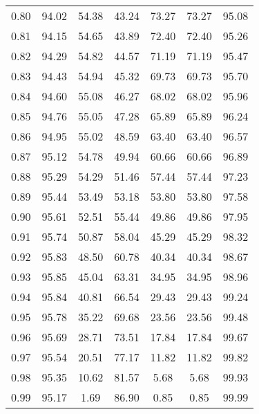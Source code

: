 \begin{tabular}{|c|c|c|c|c|c|c|}
      0.80 &     94.02 &     54.38 &      43.24 &   73.27 &      73.27 &         95.08 \\
      0.81 &     94.15 &     54.65 &      43.89 &   72.40 &      72.40 &         95.26 \\
      0.82 &     94.29 &     54.82 &      44.57 &   71.19 &      71.19 &         95.47 \\
      0.83 &     94.43 &     54.94 &      45.32 &   69.73 &      69.73 &         95.70 \\
      0.84 &     94.60 &     55.08 &      46.27 &   68.02 &      68.02 &         95.96 \\
      0.85 &     94.76 &     55.05 &      47.28 &   65.89 &      65.89 &         96.24 \\
      0.86 &     94.95 &     55.02 &      48.59 &   63.40 &      63.40 &         96.57 \\
      0.87 &     95.12 &     54.78 &      49.94 &   60.66 &      60.66 &         96.89 \\
      0.88 &     95.29 &     54.29 &      51.46 &   57.44 &      57.44 &         97.23 \\
      0.89 &     95.44 &     53.49 &      53.18 &   53.80 &      53.80 &         97.58 \\
      0.90 &     95.61 &     52.51 &      55.44 &   49.86 &      49.86 &         97.95 \\
      0.91 &     95.74 &     50.87 &      58.04 &   45.29 &      45.29 &         98.32 \\
      0.92 &     95.83 &     48.50 &      60.78 &   40.34 &      40.34 &         98.67 \\
      0.93 &     95.85 &     45.04 &      63.31 &   34.95 &      34.95 &         98.96 \\
      0.94 &     95.84 &     40.81 &      66.54 &   29.43 &      29.43 &         99.24 \\
      0.95 &     95.78 &     35.22 &      69.68 &   23.56 &      23.56 &         99.48 \\
      0.96 &     95.69 &     28.71 &      73.51 &   17.84 &      17.84 &         99.67 \\
      0.97 &     95.54 &     20.51 &      77.17 &   11.82 &      11.82 &         99.82 \\
      0.98 &     95.35 &     10.62 &      81.57 &    5.68 &       5.68 &         99.93 \\
      0.99 &     95.17 &      1.69 &      86.90 &    0.85 &       0.85 &         99.99 \\
\bottomrule
\end{tabular}
